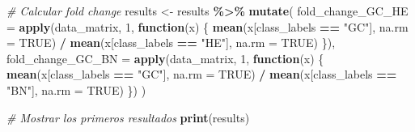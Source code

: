 \documentclass[
]{article}
\newenvironment{Shaded}{\begin{snugshade}}{\end{snugshade}}
\newcommand{\AttributeTok}[1]{\textcolor[rgb]{0.13,0.29,0.53}{#1}}
\newcommand{\CommentTok}[1]{\textcolor[rgb]{0.56,0.35,0.01}{\textit{#1}}}
\newcommand{\ConstantTok}[1]{\textcolor[rgb]{0.56,0.35,0.01}{#1}}
\newcommand{\ControlFlowTok}[1]{\textcolor[rgb]{0.13,0.29,0.53}{\textbf{#1}}}
\newcommand{\DecValTok}[1]{\textcolor[rgb]{0.00,0.00,0.81}{#1}}
\newcommand{\FunctionTok}[1]{\textcolor[rgb]{0.13,0.29,0.53}{\textbf{#1}}}
\newcommand{\NormalTok}[1]{#1}
\newcommand{\OtherTok}[1]{\textcolor[rgb]{0.56,0.35,0.01}{#1}}
\newcommand{\SpecialCharTok}[1]{\textcolor[rgb]{0.81,0.36,0.00}{\textbf{#1}}}
\newcommand{\StringTok}[1]{\textcolor[rgb]{0.31,0.60,0.02}{#1}}
\begin{document}
\begin{Shaded}
\begin{Highlighting}[]
\CommentTok{\# Calcular fold change}
\NormalTok{results }\OtherTok{\textless{}{-}}\NormalTok{ results }\SpecialCharTok{\%\textgreater{}\%}
  \FunctionTok{mutate}\NormalTok{(}
    \AttributeTok{fold\_change\_GC\_HE =} \FunctionTok{apply}\NormalTok{(data\_matrix, }\DecValTok{1}\NormalTok{, }\ControlFlowTok{function}\NormalTok{(x) \{}
      \FunctionTok{mean}\NormalTok{(x[class\_labels }\SpecialCharTok{==} \StringTok{"GC"}\NormalTok{], }\AttributeTok{na.rm =} \ConstantTok{TRUE}\NormalTok{) }\SpecialCharTok{/} \FunctionTok{mean}\NormalTok{(x[class\_labels }\SpecialCharTok{==} \StringTok{"HE"}\NormalTok{], }\AttributeTok{na.rm =} \ConstantTok{TRUE}\NormalTok{)}
\NormalTok{    \}),}
    \AttributeTok{fold\_change\_GC\_BN =} \FunctionTok{apply}\NormalTok{(data\_matrix, }\DecValTok{1}\NormalTok{, }\ControlFlowTok{function}\NormalTok{(x) \{}
      \FunctionTok{mean}\NormalTok{(x[class\_labels }\SpecialCharTok{==} \StringTok{"GC"}\NormalTok{], }\AttributeTok{na.rm =} \ConstantTok{TRUE}\NormalTok{) }\SpecialCharTok{/} \FunctionTok{mean}\NormalTok{(x[class\_labels }\SpecialCharTok{==} \StringTok{"BN"}\NormalTok{], }\AttributeTok{na.rm =} \ConstantTok{TRUE}\NormalTok{)}
\NormalTok{    \})}
\NormalTok{  )}

\CommentTok{\# Mostrar los primeros resultados}
\FunctionTok{print}\NormalTok{(results)}
\end{Highlighting}
\end{Shaded}
\end{document}
